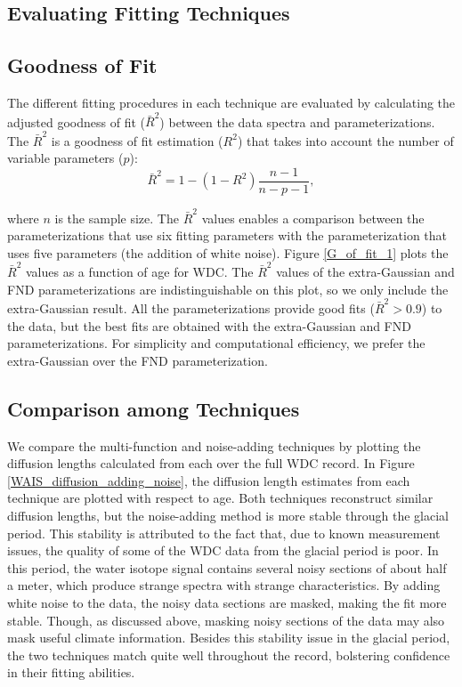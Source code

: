 \documentclass[draft, jgrga]{AGUTeX}
\begin{document}
\begin{article}
\section{Evaluating Fitting Techniques}
\subsection{Goodness of Fit}
The different fitting procedures in each technique are evaluated by calculating the adjusted goodness of fit ($\bar{R}^2$) between the data spectra and parameterizations. The $\bar{R}^2$ is a goodness of fit estimation ($R^2$) that takes into account the number of variable parameters ($p$):
\begin{equation}
\bar{R}^2 = 1 - (1 -R^2) \frac{n - 1}{n - p - 1},
\end{equation}

\noindent where $n$ is the sample size.
The $\bar{R}^2$ values enables a comparison between the parameterizations that use six fitting parameters with the parameterization that uses five parameters (the addition of white noise). Figure \ref{G_of_fit_1} plots the $\bar{R}^2$ values as a function of age for WDC. The $\bar{R}^2$ values of the extra-Gaussian and FND parameterizations are indistinguishable on this plot, so we only include the extra-Gaussian result. All the parameterizations provide good fits ($\bar{R}^2 > 0.9$) to the data, but the best fits are obtained with the extra-Gaussian and FND parameterizations. For simplicity and computational efficiency, we prefer the extra-Gaussian over the FND parameterization.

\subsection{Comparison among Techniques}
We compare the multi-function and noise-adding techniques by plotting the diffusion lengths calculated from each over the full WDC record. In Figure \ref{WAIS_diffusion_adding_noise}, the diffusion length estimates from each technique are plotted with respect to age. Both techniques reconstruct similar diffusion lengths, but the noise-adding method is more stable through the glacial period. This stability is attributed to the fact that, due to known measurement issues, the quality of some of the WDC data from the glacial period is poor. In this period, the water isotope signal contains several noisy sections of about half a meter, which produce strange spectra with strange characteristics. By adding white noise to the data, the noisy data sections are masked, making the fit more stable. Though, as discussed above, masking noisy sections of the data may also mask useful climate information. Besides this stability issue in the glacial period, the two techniques match quite well throughout the record, bolstering confidence in their fitting abilities.


\end{article}
\end{document}
